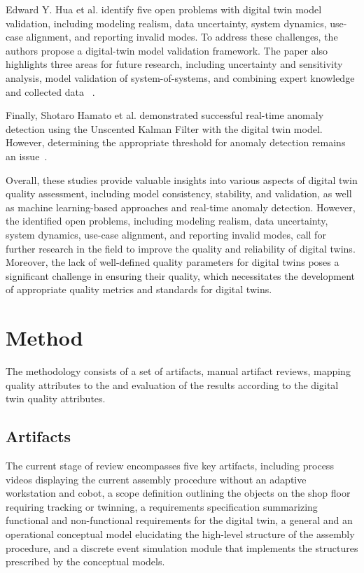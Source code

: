 \documentclass{llncs}
\begin{document}
    Edward Y. Hua et al. identify five open problems with digital twin model validation, including modeling realism, data uncertainty, system dynamics, use-case alignment, and reporting invalid modes. To address these challenges, the authors propose a digital-twin model validation framework. The paper also highlights three areas for future research, 
    including uncertainty and sensitivity analysis, model validation of system-of-systems, and combining expert knowledge and collected data ~\cite{ValidationofDigitalTwins}. 

    Finally, Shotaro Hamato et al. demonstrated successful real-time anomaly detection using the Unscented Kalman Filter with the digital twin model. 
    However, determining the appropriate threshold for anomaly detection remains an issue~\cite{JapeneseKalmanFilterCorrectness}.

    Overall, these studies provide valuable insights into various aspects of digital twin quality assessment, 
    including model consistency, stability, and validation, as well as machine learning-based approaches and real-time anomaly detection. 
    However, the identified open problems, including modeling realism, data uncertainty, system dynamics, use-case alignment, and reporting invalid modes, 
    call for further research in the field to improve the quality and reliability of digital twins. Moreover, 
    the lack of well-defined quality parameters for digital twins poses a significant challenge in ensuring their quality,
    which necessitates the development of appropriate quality metrics and standards for digital twins.
  
    \section{Method}
    The methodology consists of a set of artifacts, manual artifact reviews, mapping quality attributes to the   
    and evaluation of the results according to the digital twin quality attributes.    
    \subsection{Artifacts}\label{section:Artifacts}
    The current stage of review encompasses five key artifacts, including process videos displaying the current assembly procedure without an adaptive workstation and cobot, a scope definition outlining the objects on the shop floor requiring tracking or twinning, a requirements specification summarizing functional and non-functional requirements for the digital twin, a general and an operational conceptual model elucidating the high-level structure of the assembly procedure, 
    and a discrete event simulation module that implements the structures prescribed by the conceptual models.
\end{document}
